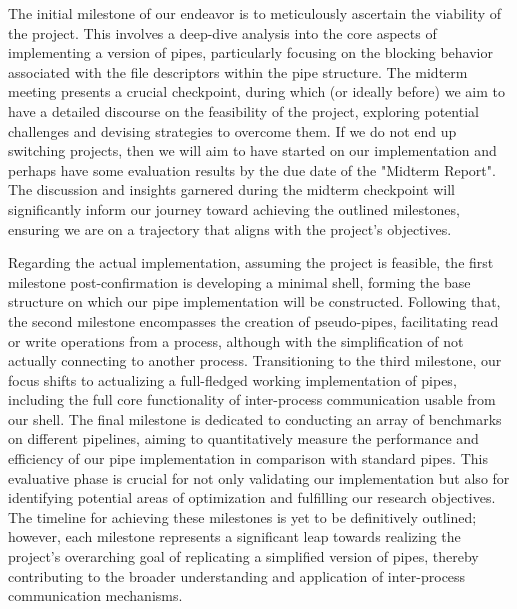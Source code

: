 The initial milestone of our endeavor is to meticulously ascertain the viability of the project. This involves a deep-dive analysis into the core aspects of implementing a version of pipes, particularly focusing on the blocking behavior associated with the file descriptors within the pipe structure. The midterm meeting presents a crucial checkpoint, during which (or ideally before) we aim to have a detailed discourse on the feasibility of the project, exploring potential challenges and devising strategies to overcome them.  If we do not end up switching projects, then we will aim to have started on our implementation and perhaps have some evaluation results by the due date of the "Midterm Report". The discussion and insights garnered during the midterm checkpoint will significantly inform our journey toward achieving the outlined milestones, ensuring we are on a trajectory that aligns with the project's objectives.

Regarding the actual implementation, assuming the project is feasible, the first milestone post-confirmation is developing a minimal shell, forming the base structure on which our pipe implementation will be constructed. Following that, the second milestone encompasses the creation of pseudo-pipes, facilitating read or write operations from a process, although with the simplification of not actually connecting to another process. Transitioning to the third milestone, our focus shifts to actualizing a full-fledged working implementation of pipes, including the full core functionality of inter-process communication usable from our shell. The final milestone is dedicated to conducting an array of benchmarks on different pipelines, aiming to quantitatively measure the performance and efficiency of our pipe implementation in comparison with standard pipes. This evaluative phase is crucial for not only validating our implementation but also for identifying potential areas of optimization and fulfilling our research objectives. The timeline for achieving these milestones is yet to be definitively outlined; however, each milestone represents a significant leap towards realizing the project's overarching goal of replicating a simplified version of pipes, thereby contributing to the broader understanding and application of inter-process communication mechanisms.





